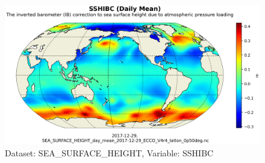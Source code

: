 \begin{figure}[H]
\centering
\includegraphics[scale=0.55]{../images/plots/latlon_plots/Sea_Surface_Height/SSHIBC.png}
\caption{Dataset: SEA\_SURFACE\_HEIGHT, Variable: SSHIBC}
\label{tab:table-SEA_SURFACE_HEIGHT_SSHIBC-Plot}
\end{figure}
\pagebreak
